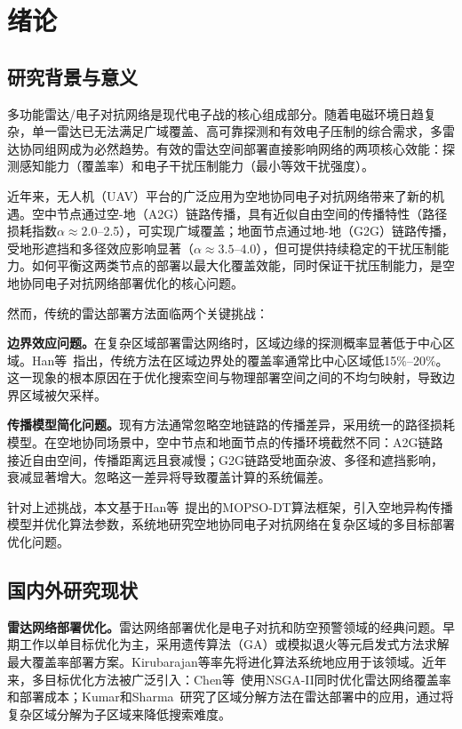 \section{绪论}
\label{sec:introduction}

\subsection{研究背景与意义}

多功能雷达/电子对抗网络是现代电子战的核心组成部分。随着电磁环境日趋复杂，单一雷达已无法满足广域覆盖、高可靠探测和有效电子压制的综合需求，多雷达协同组网成为必然趋势。有效的雷达空间部署直接影响网络的两项核心效能：探测感知能力（覆盖率）和电子干扰压制能力（最小等效干扰强度）。

近年来，无人机（UAV）平台的广泛应用为空地协同电子对抗网络带来了新的机遇。空中节点通过空-地（A2G）链路传播，具有近似自由空间的传播特性（路径损耗指数$\alpha \approx 2.0$--2.5），可实现广域覆盖；地面节点通过地-地（G2G）链路传播，受地形遮挡和多径效应影响显著（$\alpha \approx 3.5$--4.0），但可提供持续稳定的干扰压制能力。如何平衡这两类节点的部署以最大化覆盖效能，同时保证干扰压制能力，是空地协同电子对抗网络部署优化的核心问题。

然而，传统的雷达部署方法面临两个关键挑战：

\textbf{边界效应问题。}在复杂区域部署雷达网络时，区域边缘的探测概率显著低于中心区域。Han等~\cite{Han2025}指出，传统方法在区域边界处的覆盖率通常比中心区域低15\%--20\%。这一现象的根本原因在于优化搜索空间与物理部署空间之间的不均匀映射，导致边界区域被欠采样。

\textbf{传播模型简化问题。}现有方法通常忽略空地链路的传播差异，采用统一的路径损耗模型。在空地协同场景中，空中节点和地面节点的传播环境截然不同：A2G链路接近自由空间，传播距离远且衰减慢；G2G链路受地面杂波、多径和遮挡影响，衰减显著增大。忽略这一差异将导致覆盖计算的系统偏差。

针对上述挑战，本文基于Han等~\cite{Han2025}提出的MOPSO-DT算法框架，引入空地异构传播模型并优化算法参数，系统地研究空地协同电子对抗网络在复杂区域的多目标部署优化问题。

\subsection{国内外研究现状}

\textbf{雷达网络部署优化。}雷达网络部署优化是电子对抗和防空预警领域的经典问题。早期工作以单目标优化为主，采用遗传算法（GA）或模拟退火等元启发式方法求解最大覆盖率部署方案。Kirubarajan等率先将进化算法系统地应用于该领域。近年来，多目标优化方法被广泛引入：Chen等~\cite{Chen2023}使用NSGA-II同时优化雷达网络覆盖率和部署成本；Kumar和Sharma~\cite{Kumar2022}研究了区域分解方法在雷达部署中的应用，通过将复杂区域分解为子区域来降低搜索难度。

